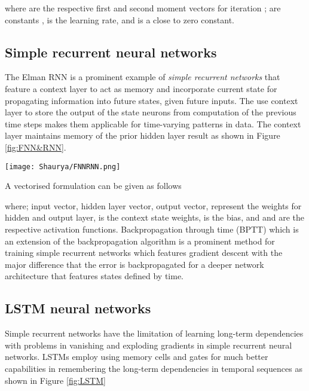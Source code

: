 \documentclass[final,5p,times,twocolumn]{elsarticle}
\begin{document}
 where  are the respective first  and second  moment vectors for iteration ;  are constants ,  is the learning rate, and  is a close to zero constant. 

  
 
 \subsection{Simple recurrent neural networks}
 
  The Elman RNN \cite{Elman_1990} is a prominent example of   \textit{simple recurrent networks} that  feature  a  context layer to act as memory  and incorporate current state for propagating information into future states, given future inputs. The   use context layer  to store the output of the state neurons from computation of the previous time steps  makes them applicable for time-varying patterns in  data.  The context layer   maintains memory of the prior hidden layer result as shown in Figure \ref{fig:FNN&RNN}.  
  
 

 \begin{figure*}[tb]
  \begin{center}  
   \texttt{[image: Shaurya/FNNRNN.png]} \\
    \caption{ Feed Forward Neural Network and Elman RNN for time series prediction }
\end{center}
   \label{fig:FNN&RNN}
\end{figure*}
A vectorised formulation can be given as follows
 
  
 
 
 
 \noindent  where;  input vector,  hidden layer vector,  output vector,  represent the weights for hidden  and output layer,   is the context state weights,     is the bias,  and    and    are the respective activation functions. Backpropagation through time (BPTT) \cite{Werbos_1990} which is an extension of the backpropagation algorithm  is a prominent method for training simple recurrent networks which  features   gradient descent  with the major difference   that the error is backpropagated for a deeper network architecture that features states defined by time. 
 
 \subsection{LSTM neural networks}
 
 Simple recurrent networks have the \cite{hochreiter1997long} limitation of learning long-term dependencies with problems in vanishing and exploding gradients  \cite{Hochreiter_1998} in simple recurrent neural networks. LSTMs employ using memory cells and gates for much better capabilities in remembering the   long-term dependencies   in temporal sequences   as shown in Figure \ref{fig:LSTM}
\end{document}
